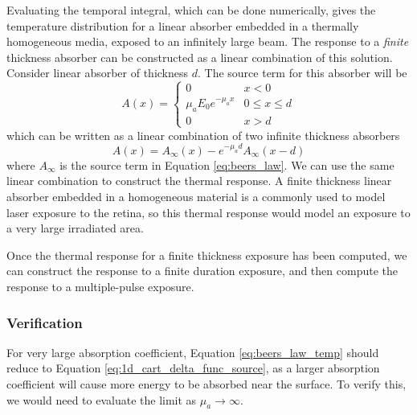 \documentclass[letterpaper,10pt]{article}
\begin{document}
Evaluating the temporal integral, which can be done numerically, gives the temperature distribution for a linear absorber embedded
in a thermally homogeneous media, exposed to an infinitely large beam. The response to a \emph{finite} thickness absorber can be constructed
as a linear combination of this solution. Consider linear absorber of thickness $d$. The source term for this absorber will be
\begin{equation}
  \label{eq:beers_law_finite}
  A(x) = \begin{cases}
    0 & x < 0 \\
    \mu_a E_0 e^{-\mu_a x} & 0 \le x \le d \\
    0  & x > d
  \end{cases}
\end{equation}
which can be written as a linear  combination of two infinite thickness absorbers
\begin{equation}
  A(x) = A_\infty(x) - e^{-\mu_a d}A_\infty(x-d)
\end{equation}
where $A_\infty$ is the source term in Equation \ref{eq:beers_law}. We can use the same linear combination to construct the thermal
response. A finite thickness linear absorber embedded in a homogeneous material is a commonly used to model laser exposure to the retina, so this
thermal response would model an exposure to a very large irradiated area.

Once the thermal response for a finite thickness exposure has been computed, we can construct the response to a finite duration exposure, and then
compute the response to a multiple-pulse exposure.

\subsubsection{Verification}
\label{sub:verification}
For very large absorption coefficient, Equation \ref{eq:beers_law_temp} should reduce to Equation \ref{eq:1d_cart_delta_func_source}, as a larger
absorption coefficient will cause more energy to be absorbed near the surface. To verify this,
we would need to evaluate the limit as $\mu_a \rightarrow \infty$.




\end{document}
